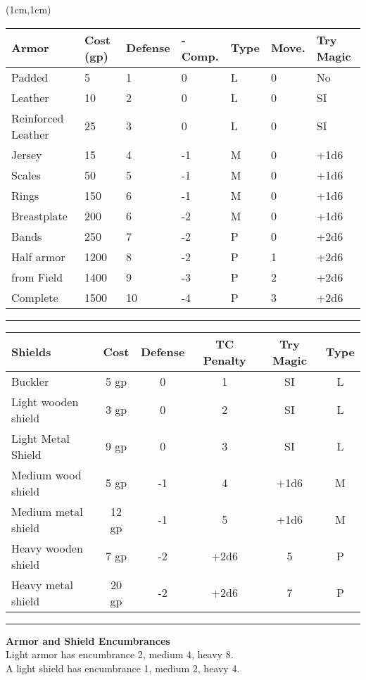 \documentclass[a4paper,12 pt,openany]{book}
\newcommand{\linex}{\rule{\textwidth}{0.4pt}}
\begin{document}
\begin{textblock*}{15cm}(1cm,1cm) %

\begin{tabular}{lllllll}
\textbf{Armor} & \textbf{Cost (gp)} & \textbf{Defense} & \textbf{-Comp.} & \textbf{Type} & \textbf{Move.} & \textbf{Try Magic}\\
\hline
Padded & 5 & 1 & 0 & L & 0 & No\\
Leather & 10 & 2 & 0 & L & 0 & SI\\
Reinforced Leather & 25 &3 & 0 & L & 0 &SI \\
Jersey & 15 & 4 & -1 & M & 0 &+1d6\\
Scales& 50 & 5 & -1 & M & 0 &+1d6 \\
Rings & 150 & 6 & -1 & M & 0 &+1d6\\
Breastplate & 200 & 6 & -2 & M & 0 &+1d6 \\
Bands & 250 & 7 & -2 & P & 0 &+2d6 \\
Half armor & 1200 & 8 & -2 & P & 1 &+2d6 \\
from Field& 1400 & 9 & -3 & P & 2 &+2d6 \\
Complete & 1500 & 10 & -4 & P & 3 &+2d6 \\
\end{tabular}

\linex

\begin{tabular}{lccccc}
\textbf{Shields} & \textbf{Cost} & \textbf{Defense} & \textbf{TC Penalty} & \textbf{Try Magic} & \textbf{Type}\\
\hline
Buckler& 5 gp & 0& 1& SI& L\\
Light wooden shield & 3 gp & 0& 2& SI & L\\
Light Metal Shield & 9 gp & 0& 3&SI & L\\
Medium wood shield & 5 gp & -1& 4& +1d6 & M\\
Medium metal shield & 12 gp & -1 & 5& +1d6 & M\\
Heavy wooden shield & 7 gp & -2 & +2d6&5 & P\\
Heavy metal shield & 20 gp & -2 & +2d6&7 & P\\
\end{tabular}

\linex

\textbf{Armor and Shield Encumbrances}\\
Light armor has encumbrance 2, medium 4, heavy 8.\\
A light shield has encumbrance 1, medium 2, heavy 4.


\end{textblock*}
\end{document}
